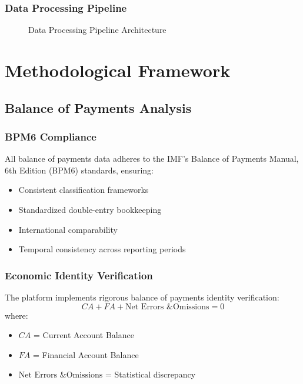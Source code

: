 \documentclass[11pt,a4paper]{article}
\begin{document}
\subsubsection{Data Processing Pipeline}
\begin{figure}[h]
\centering
{}
\caption{Data Processing Pipeline Architecture}
\end{figure}

\section{Methodological Framework}

\subsection{Balance of Payments Analysis}

\subsubsection{BPM6 Compliance}
All balance of payments data adheres to the IMF's Balance of Payments Manual, 6th Edition (BPM6) standards, ensuring:
\begin{itemize}
    \item Consistent classification frameworks
    \item Standardized double-entry bookkeeping
    \item International comparability
    \item Temporal consistency across reporting periods
\end{itemize}

\subsubsection{Economic Identity Verification}
The platform implements rigorous balance of payments identity verification:
\begin{equation}
CA + FA + \text{Net Errors \& Omissions} = 0
\end{equation}
where:
\begin{itemize}
    \item $CA$ = Current Account Balance
    \item $FA$ = Financial Account Balance
    \item $\text{Net Errors \& Omissions}$ = Statistical discrepancy
\end{itemize}
\end{document}
